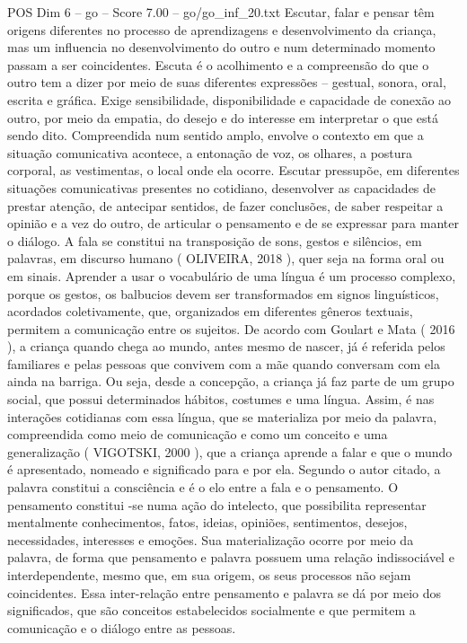 \begin{textsample}{POS Dim 6 – go – Score 7.00 – go/go\_inf\_20.txt}
Escutar, falar e pensar têm origens diferentes no processo de aprendizagens e desenvolvimento da criança, mas um influencia no desenvolvimento do outro e num determinado momento passam a ser coincidentes.
Escuta é o acolhimento e a compreensão do que o outro tem a dizer por meio de suas diferentes expressões – gestual, sonora, oral, escrita e gráfica.
Exige sensibilidade, disponibilidade e capacidade de conexão ao outro, por meio da empatia, do desejo e do interesse em interpretar o que está sendo dito.
Compreendida num sentido amplo, envolve o contexto em que a situação comunicativa acontece, a entonação de voz, os olhares, a postura corporal, as vestimentas, o local onde ela ocorre.
Escutar pressupõe, em diferentes situações comunicativas presentes no cotidiano, desenvolver as capacidades de prestar atenção, de antecipar sentidos, de fazer conclusões, de saber respeitar a opinião e a vez do outro, de articular o pensamento e de se expressar para manter o diálogo.
A fala se constitui na transposição de sons, gestos e silêncios, em palavras, em discurso humano ( OLIVEIRA, 2018 ), quer seja na forma oral ou em sinais.
Aprender a usar o vocabulário de uma língua é um processo complexo, porque os gestos, os balbucios devem ser transformados em signos linguísticos, acordados coletivamente, que, organizados em diferentes gêneros textuais, permitem a comunicação entre os sujeitos.
De acordo com Goulart e Mata ( 2016 ), a criança quando chega ao mundo, antes mesmo de nascer, já é referida pelos familiares e pelas pessoas que convivem com a mãe quando conversam com ela ainda na barriga.
Ou seja, desde a concepção, a criança já faz parte de um grupo social, que possui determinados hábitos, costumes e uma língua.
Assim, é nas interações cotidianas com essa língua, que se materializa por meio da palavra, compreendida como meio de comunicação e como um conceito e uma generalização ( VIGOTSKI, 2000 ), que a criança aprende a falar e que o mundo é apresentado, nomeado e significado para e por ela.
Segundo o autor citado, a palavra constitui a consciência e é o elo entre a fala e o pensamento.
O pensamento constitui -se numa ação do intelecto, que possibilita representar mentalmente conhecimentos, fatos, ideias, opiniões, sentimentos, desejos, necessidades, interesses e emoções.
Sua materialização ocorre por meio da palavra, de forma que pensamento e palavra possuem uma relação indissociável e interdependente, mesmo que, em sua origem, os seus processos não sejam coincidentes.
Essa inter-relação entre pensamento e palavra se dá por meio dos significados, que são conceitos estabelecidos socialmente e que permitem a comunicação e o diálogo entre as pessoas.

\end{textsample}
